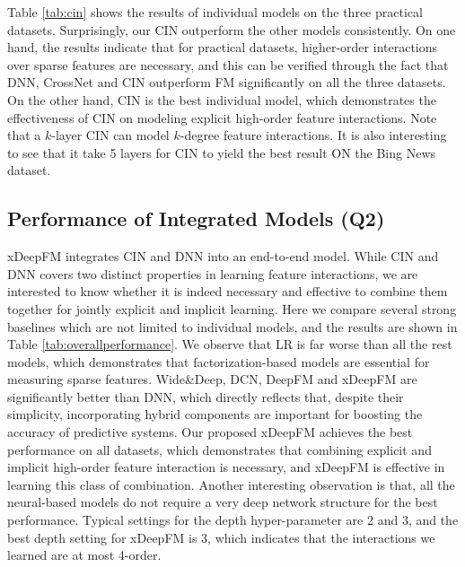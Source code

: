  \indent Table \ref{tab:cin} shows the results of individual models on the three practical datasets. Surprisingly, our CIN outperform the other models consistently. On one hand, the results indicate that for practical datasets, higher-order interactions over sparse features are necessary, and this can be verified through the fact that DNN, CrossNet and CIN outperform FM significantly on all the three datasets.  On the other hand, CIN is the best individual model, which demonstrates the effectiveness of CIN on modeling explicit high-order feature interactions. Note that a $k$-layer CIN can model $k$-degree feature interactions. It is also interesting to see that it take 5 layers for CIN to yield the best result ON the Bing News dataset.
\subsection{Performance of Integrated Models (Q2)}
xDeepFM integrates CIN and DNN into an end-to-end model. While CIN and DNN covers two distinct properties in learning feature interactions, we are interested to know whether it is indeed necessary and effective to combine them together for jointly explicit and implicit learning. Here we compare several strong baselines which are not limited to individual models, and the results are shown in Table \ref{tab:overallperformance}. We observe that LR is far worse than all the rest models, which demonstrates that factorization-based models are essential for measuring sparse features. Wide\&Deep, DCN, DeepFM and xDeepFM are significantly better than DNN, which directly reflects that,  despite their simplicity, incorporating hybrid components are important for boosting the accuracy of predictive systems. Our proposed xDeepFM achieves the best performance on all datasets, which demonstrates that combining explicit and implicit high-order feature interaction is necessary, and xDeepFM is effective in learning this class of combination. Another interesting observation is that, all the neural-based models do not require a very deep network structure for the best performance. Typical settings for the depth hyper-parameter are 2 and 3, and the best depth setting for xDeepFM is 3, which indicates that the interactions we learned are at most 4-order.
